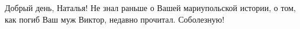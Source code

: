  
 
 
 
 

Добрый день, Наталья! Не знал раньше о Вашей мариупольской истории, о том, как
погиб Ваш муж Виктор, недавно прочитал. Соболезную!

